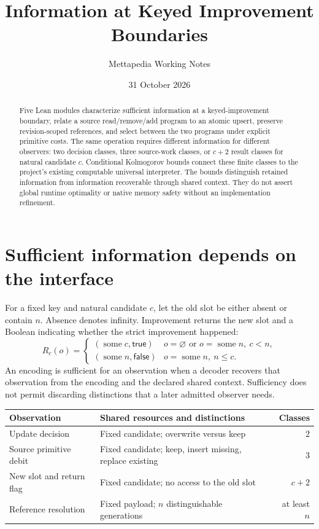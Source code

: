 \documentclass[11pt,a4paper]{article}
\title{Information at Keyed Improvement Boundaries}
\author{Mettapedia Working Notes}
\date{31 October 2026}
\begin{document}
\maketitle
\begin{abstract}
Five Lean modules characterize sufficient information at a keyed-improvement
boundary, relate a source read/remove/add program to an atomic upsert, preserve
revision-scoped references, and select between the two programs under explicit
primitive costs. The same operation requires different information for different
observers: two decision classes, three source-work classes, or $c+2$ result
classes for natural candidate $c$. Conditional Kolmogorov bounds connect these
finite classes to the project's existing computable universal interpreter.
The bounds distinguish retained information from information recoverable through
shared context. They do not assert global runtime optimality or native memory
safety without an implementation refinement.
\end{abstract}

\section{Sufficient information depends on the interface}

For a fixed key and natural candidate $c$, let the old slot be either absent
or contain $n$. Absence denotes infinity. Improvement returns the new slot and
a Boolean indicating whether the strict improvement happened:
\[
 R_c(o)=\begin{cases}
 (\operatorname{some}c,\mathsf{true})&o=\varnothing\text{ or }o=\operatorname{some}n,\ c<n,\\
 (\operatorname{some}n,\mathsf{false})&o=\operatorname{some}n,\ n\le c.
 \end{cases}
\]
An encoding is sufficient for an observation when a decoder recovers that
observation from the encoding and the declared shared context. Sufficiency
does not permit discarding distinctions that a later admitted observer needs.

\begin{center}
\begin{tabularx}{\linewidth}{@{}lXr@{}}
\toprule
Observation & Shared resources and distinctions & Classes\\
\midrule
Update decision & Fixed candidate; overwrite versus keep & $2$\\
Source primitive debit & Fixed candidate; keep, insert missing, replace existing & $3$\\
New slot and return flag & Fixed candidate; no access to the old slot & $c+2$\\
Reference resolution & Fixed payload; $n$ distinguishable generations & at least $n$\\
\bottomrule
\end{tabularx}
\end{center}
\end{document}
